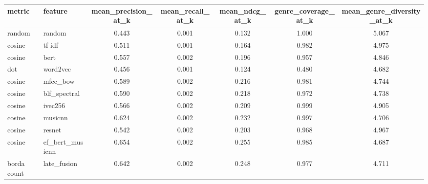 \begin{tabular}{llccccc}
\toprule
     metric &         feature &  mean\_precision\_at\_k &  mean\_recall\_at\_k &  mean\_ndcg\_at\_k &  genre\_coverage\_at\_k &  mean\_genre\_diversity\_at\_k \\
\midrule
     random &          random &                0.443 &             0.001 &           0.132 &                1.000 &                      5.067 \\
     cosine &          tf-idf &                0.511 &             0.001 &           0.164 &                0.982 &                      4.975 \\
     cosine &            bert &                0.557 &             0.002 &           0.196 &                0.957 &                      4.846 \\
        dot &        word2vec &                0.456 &             0.001 &           0.124 &                0.480 &                      4.682 \\
     cosine &        mfcc\_bow &                0.589 &             0.002 &           0.216 &                0.981 &                      4.744 \\
     cosine &    blf\_spectral &                0.590 &             0.002 &           0.218 &                0.972 &                      4.738 \\
     cosine &         ivec256 &                0.566 &             0.002 &           0.209 &                0.999 &                      4.905 \\
     cosine &         musicnn &                0.624 &             0.002 &           0.232 &                0.997 &                      4.706 \\
     cosine &          resnet &                0.542 &             0.002 &           0.203 &                0.968 &                      4.967 \\
     cosine & ef\_bert\_musicnn &                0.654 &             0.002 &           0.255 &                0.985 &                      4.687 \\
borda count &     late\_fusion &                0.642 &             0.002 &           0.248 &                0.977 &                      4.711 \\
\bottomrule
\end{tabular}
